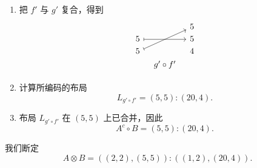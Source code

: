 \begin{example}
\begin{enumerate}
        \[ \begin{tikzcd}[row sep = 1, column sep = 8]
         & & & & 5\\
        5 \ar[drr,mapsto] & & 5 \ar[urr,mapsto] & & 5 \\
        5 \ar[urr,mapsto] & & 5 \ar[urr,mapsto] & & 4\\
        & f' & & g' & \\
        \end{tikzcd} \]
        \item 把 $f'$ 与 $g'$ 复合，得到
        \[ \begin{tikzcd}[row sep = 1, column sep = 8]
         & & 5\\
        5 \ar[rr,mapsto] & & 5\\
        5 \ar[uurr,mapsto] & & 4\\
        & g' \circ f' & \\
        \end{tikzcd} \]
        \item 计算所编码的布局
        \[
        L_{g' \circ f'} = (5,5):(20,4).
        \]
        \item 布局 $L_{g' \circ f'}$ 在 $(5,5)$ 上已合并，因此
        \[
        A^c \circ B = (5,5):(20,4).
        \]
    \end{enumerate}
我们断定
        \[
        A \otimes B = ((2,2),(5,5)):((1,2),(20,4)).
        \]

\end{example}

\appendix

